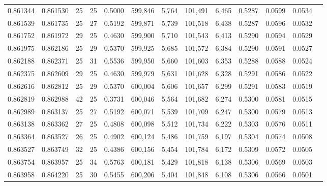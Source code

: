 \begin{tabular}{rrrrrrrrrrrrr}
0.861344 & 0.861530 &    25 &  25 &                                     0.5000 & 599,846 &   5,764 & 101,491 &   6,465 & 0.5287 & 0.0599 & 0.0534 \\
0.861539 & 0.861735 &    25 &  27 &                                     0.5192 & 599,871 &   5,739 & 101,518 &   6,438 & 0.5287 & 0.0596 & 0.0532 \\
0.861752 & 0.861972 &    29 &  25 &                                     0.4630 & 599,900 &   5,710 & 101,543 &   6,413 & 0.5290 & 0.0594 & 0.0529 \\
0.861975 & 0.862186 &    25 &  29 &                                     0.5370 & 599,925 &   5,685 & 101,572 &   6,384 & 0.5290 & 0.0591 & 0.0527 \\
0.862188 & 0.862371 &    25 &  31 &                                     0.5536 & 599,950 &   5,660 & 101,603 &   6,353 & 0.5288 & 0.0588 & 0.0524 \\
0.862375 & 0.862609 &    29 &  25 &                                     0.4630 & 599,979 &   5,631 & 101,628 &   6,328 & 0.5291 & 0.0586 & 0.0522 \\
0.862616 & 0.862812 &    25 &  29 &                                     0.5370 & 600,004 &   5,606 & 101,657 &   6,299 & 0.5291 & 0.0583 & 0.0519 \\
0.862819 & 0.862988 &    42 &  25 &                                     0.3731 & 600,046 &   5,564 & 101,682 &   6,274 & 0.5300 & 0.0581 & 0.0515 \\
0.862989 & 0.863137 &    25 &  27 &                                     0.5192 & 600,071 &   5,539 & 101,709 &   6,247 & 0.5300 & 0.0579 & 0.0513 \\
0.863138 & 0.863362 &    27 &  25 &                                     0.4808 & 600,098 &   5,512 & 101,734 &   6,222 & 0.5303 & 0.0576 & 0.0511 \\
0.863364 & 0.863527 &    26 &  25 &                                     0.4902 & 600,124 &   5,486 & 101,759 &   6,197 & 0.5304 & 0.0574 & 0.0508 \\
0.863527 & 0.863749 &    32 &  25 &                                     0.4386 & 600,156 &   5,454 & 101,784 &   6,172 & 0.5309 & 0.0572 & 0.0505 \\
0.863754 & 0.863957 &    25 &  34 &                                     0.5763 & 600,181 &   5,429 & 101,818 &   6,138 & 0.5306 & 0.0569 & 0.0503 \\
0.863958 & 0.864220 &    25 &  30 &                                     0.5455 & 600,206 &   5,404 & 101,848 &   6,108 & 0.5306 & 0.0566 & 0.0501 \\

\end{tabular}
